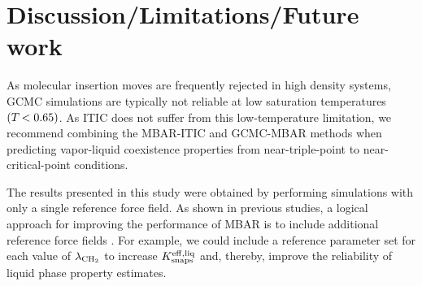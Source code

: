 \documentclass[journal=jced,manuscript=article]{achemso}
\begin{document}

\section{Discussion/Limitations/Future work} \label{sec: Discussion}

As molecular insertion moves are frequently rejected in high density systems, GCMC simulations are typically not reliable at low saturation temperatures $(T_{\rm } < 0.65)$. As ITIC does not suffer from this low-temperature limitation, we recommend combining the MBAR-ITIC and GCMC-MBAR methods when predicting vapor-liquid coexistence properties from near-triple-point to near-critical-point conditions.

The results presented in this study were obtained by performing simulations with only a single reference force field. As shown in previous studies, a logical approach for improving the performance of MBAR is to include additional reference force fields \cite{Postdoc_1,Postdoc_2}. For example, we could include a reference parameter set for each value of $\lambda_{\rm CH_2}$ to increase $K_{\rm snaps}^{\rm eff, liq}$ and, thereby, improve the reliability of liquid phase property estimates.
\end{document}
